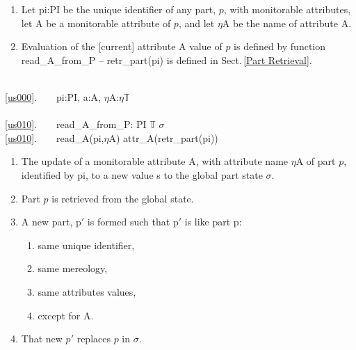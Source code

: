 \label{Evaluation of Monitorable Attributes}

\begin{enumerate}\setei
\item \label{us000} Let \textsf{pi:PI} be the unique identifier of any
  part, $p$, with monitorable attributes, let \textsf{A} be a
  monitorable attribute of $p$, and let \textsf{$\eta$A} be the name
  of attribute \textsf{A}.
\item \label{us010} Evaluation of the [current] attribute  \textsf{A}
  value of $p$ is defined by function \textsf{read\_A\_from\_P} --
  \textsf{retr\_part(pi)} is defined in Sect.\,\vref{Part Retrieval}.
\savei\end{enumerate}

%
\bp
{}\\
\ref{us000}.\ \ \ \ pi:PI, a:A, $\eta$A:$\eta$$\mathbb{T}$\\
\\
\ref{us010}.\ \ \ \ read\_A\_from\_P: PI {\TIMES} $\mathbb{T}$ {\RIGHTARROW}  $\sigma$ \label{readA}\\
\ref{us010}.\ \ \ \ read\_A(pi,$\eta$A) {\IS} attr\_A(retr\_part(pi))
\ep
        
\label{Update of Biddable Attributes}

\begin{enumerate}\setei
\item \label{us040} The update of a monitorable attribute \textsf{A},
  with attribute name \textsf{$\eta$A}
  of part $p$, identified by \textsf{pi}, to a new value s
  to the global part state $\sigma$. 
\item \label{us060} Part $p$ is retrieved from the global state.
\item \label{us070} A new part, \textsf{p$'$} is formed such that
  \textsf{p$'$} is like part \textsf{p}:
\begin{enumerate}
\item \label{us080} same unique identifier, 
\item \label{us081} same mereology,
\item \label{us082} same attributes values,
\item \label{us083} except for \textsf{A}.
\end{enumerate}
\item \label{us100} That new $p'$ replaces $p$ in $\sigma$.
\savei\end{enumerate}


